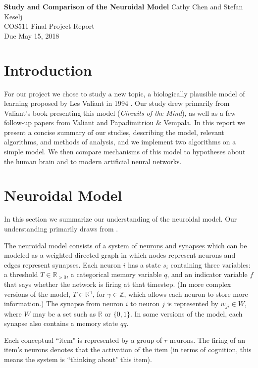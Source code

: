 \documentclass[letterpaper, 12pt]{article}
\begin{document}
\noindent
\textbf{Study and Comparison of the Neuroidal Model} \hfill \newline Cathy Chen and Stefan Keselj \\
COS511 Final Project Report \\
Due May 15, 2018

\section{Introduction}
For our project we chose to study a new topic, a biologically plausible model of learning proposed by Les Valiant in 1994 \cite{valiant_circuits_1994}. Our study drew primarily from Valiant's book presenting this model (\textit{Circuits of the Mind}), as well as a few follow-up papers from Valiant and Papadimitriou \& Vempala. In this report we present a concise summary of our studies, describing the model, relevant algorithms, and methods of analysis, and we implement two algorithms on a simple model. We then compare mechanisms of this model to hypotheses about the human brain and to modern artificial neural networks.

\section{Neuroidal Model}\label{sec:model}
In this section we summarize our understanding of the neuroidal model. Our understanding primarily draws from \cite{valiant_circuits_1994, valiant_memorization_2005, papadimitriou_cortical_2015}.

The neuroidal model consists of a system of \underline{neurons} and \underline{synapses} which can be modeled as a weighted directed graph in which nodes represent neurons and edges represent synapses. Each neuron $i$ has a state $s_i$ containing three variables: a threshold $T\in\mathbb{R}_{>0}$, a categorical memory variable $q$, and an indicator variable $f$ that says whether the network is firing at that timestep. (In more complex versions of the model, $T\in\mathbb{R}^\gamma$, for $\gamma\in\mathbb{Z}$, which allows each neuron to store more information.) The synapse from neuron $i$ to neuron $j$ is represented by $w_{ji}\in W$, where $W$ may be a set such as $\mathbb{R}$ or $\{0,1\}$. In some versions of the model, each synapse also contains a memory state $qq$.

Each conceptual ``item" is represented by a group of $r$ neurons. The firing of an item's neurons denotes that the activation of the item (in terms of cognition, this means the system is ``thinking about" this item). 
\end{document}
